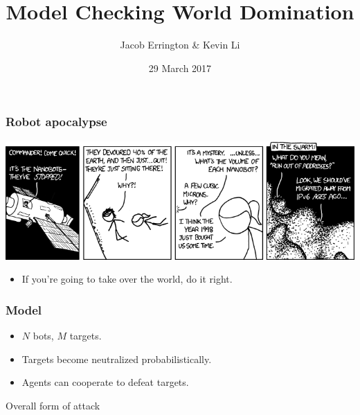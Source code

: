 \documentclass{beamer}
\title{Model Checking World Domination}
\author{Jacob Errington \& Kevin Li}
\institute{McGill University}
\date{29 March 2017}
\begin{document}
\frame{\titlepage}

\begin{frame}
    \frametitle{Robot apocalypse}

    \includegraphics[width=\textwidth]{nanobots.png}

    \pause

    \begin{itemize}
        \item
            If you're going to take over the world, \alert{do it right.}
    \end{itemize}
\end{frame}

\begin{frame}
    \frametitle{Model}

    \begin{itemize}
        \item
            $N$ bots, $M$ targets.
        \item
            Targets become neutralized probabilistically.
        \item
            Agents can cooperate to defeat targets.
    \end{itemize}

    \begin{center}

        Overall form of attack
    \end{center}
\end{frame}
\end{document}
